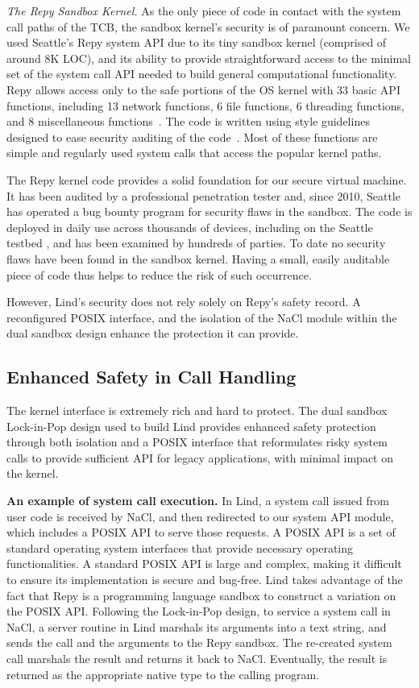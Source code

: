 \textit{The Repy Sandbox Kernel.}
As the only piece of code in contact with the system call paths of the TCB,
the sandbox kernel's security is of paramount concern.
We used Seattle's Repy system API due to its tiny sandbox kernel
(comprised of around 8K LOC), and its ability to provide straightforward
access to the minimal set of the system call API needed to build general
computational functionality. Repy allows
access only to the safe portions of the OS kernel with 33 basic API
functions, including 13 network functions, 6 file functions, 6 threading functions,
and 8 miscellaneous functions~\cite{Repy-10, RepyKernel}. The code is
written using style guidelines designed to ease security auditing
 of the code~\cite{style}. Most of these functions are simple and
regularly used system calls that access the popular kernel paths.

The Repy kernel code provides a solid foundation for our secure virtual
machine. It has been audited by a professional penetration tester and, since 2010,
Seattle has operated a bug bounty program for security flaws in the sandbox.
The code is deployed in daily use across thousands of devices,
including on the Seattle testbed \cite{seattle}, and has been examined by
hundreds of parties. To date no security flaws have been found in the sandbox
kernel. Having a small, easily auditable piece of code thus helps to reduce the
risk of such occurrence.

However, Lind's security does not rely solely on Repy's
safety record. A reconfigured POSIX interface, and the isolation of
the NaCl module within the dual sandbox design enhance the protection it can
provide.

\subsection{Enhanced Safety in Call Handling}

The kernel interface is extremely rich and hard to protect.
The dual sandbox Lock-in-Pop design used to build Lind provides enhanced
safety protection through both isolation and a POSIX interface that
reformulates risky system calls to
provide sufficient API for legacy applications, with minimal impact on the kernel.

\textbf{An example of system call execution.}
In Lind, a system call issued from user code is
received by NaCl, and then redirected to our system API module, which
includes a POSIX API to serve those requests. A POSIX API is a set of standard
operating system interfaces that provide
necessary operating functionalities. A standard POSIX API is large and complex,
making it difficult to ensure its implementation is secure and bug-free.
Lind takes advantage of the fact that Repy is a programming language sandbox to
construct a variation on the POSIX API. Following the
Lock-in-Pop design, to service a system call in NaCl, a server routine in
Lind marshals its arguments into a text string, and sends the call and the arguments
to the Repy sandbox. The re-created system call marshals the result and
returns it back to NaCl. Eventually, the result is returned as the appropriate
native type to the calling program.

